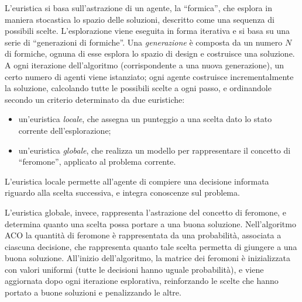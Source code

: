 L'euristica si basa sull'astrazione di un agente, la ``formica'', che esplora
in maniera stocastica lo spazio delle soluzioni, descritto come una sequenza di possibili scelte.
L'esplorazione viene eseguita in forma iterativa e si basa su una serie di
``generazioni di formiche''. Una \emph{generazione} \`e composta da un
numero $N$ di formiche, ognuna di esse esplora lo spazio di design e costruisce una soluzione.
A ogni iterazione dell'algoritmo (corrispondente a una nuova generazione), un certo numero di agenti viene istanziato;
ogni agente costruisce incrementalmente la soluzione, calcolando tutte le possibili scelte a ogni passo, e ordinandole secondo un
criterio determinato da due euristiche:
\begin{itemize}
  \item un'euristica \emph{locale}, che assegna un punteggio a una scelta dato
    lo stato corrente dell'esplorazione;
  \item un'euristica \emph{globale}, che realizza un modello per rappresentare il concetto
    di ``feromone'', applicato al problema corrente.
\end{itemize}
L'euristica locale permette all'agente di compiere una decisione informata riguardo
alla scelta successiva, e integra conoscenze sul problema.

L'euristica globale, invece, rappresenta l'astrazione del concetto di feromone,
e determina quanto una scelta possa portare a una buona soluzione.
Nell'algoritmo \ac{ACO} la quantità di feromone \`e rappresentata da una probabilità,
associata a ciascuna decisione, che rappresenta quanto tale scelta permetta di giungere a una buona soluzione.
All'inizio dell'algoritmo, la matrice dei feromoni è inizializzata con valori uniformi 
(tutte le decisioni hanno uguale probabilità), e viene aggiornata dopo ogni
iterazione esplorativa, reinforzando le scelte che hanno portato a buone soluzioni
e penalizzando le altre.

